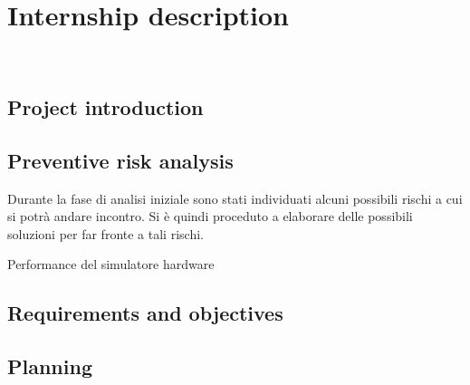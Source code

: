 
\chapter{Internship description}
\label{cap:descrizione-stage}

\\

\section{Project introduction}

\section{Preventive risk analysis}

Durante la fase di analisi iniziale sono stati individuati alcuni possibili rischi a cui si potrà andare incontro.
Si è quindi proceduto a elaborare delle possibili soluzioni per far fronte a tali rischi.\\

\begin{risk}{Performance del simulatore hardware}
    \label{risk:hardware-simulator} 
\end{risk}

\section{Requirements and objectives}


\section{Planning}